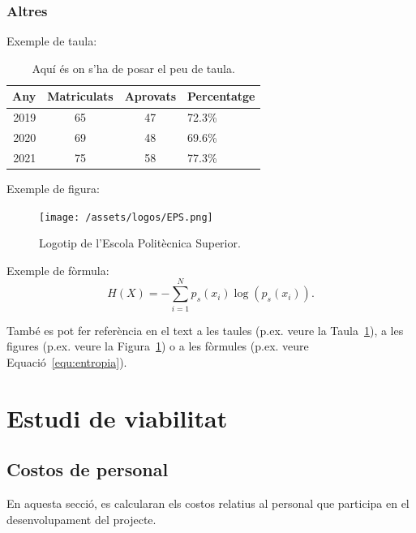 \documentclass[a4paper,12pt]{ThesisStyle}
\begin{document}
\subsection{Altres}

Exemple de taula:
\begin{table}[htb]
  \centering
  \begin{tabular}{ | r | c | c | l | }
    \hline
    Any  & Matriculats & Aprovats & Percentatge \\
    \hline
    2019 & 65          & 47       & 72.3\%      \\
    2020 & 69          & 48       & 69.6\%      \\
    2021 & 75          & 58       & 77.3\%      \\
    \hline
  \end{tabular}
  \caption{\label{taula:taulaexemple} Aquí és on s'ha de posar el peu de taula. }
\end{table}

Exemple de figura:
\begin{figure}[htb]
  \centering
  \texttt{[image: /assets/logos/EPS.png]}
  \caption{\label{fig:logo} Logotip de l'Escola Politècnica Superior.}
\end{figure}

Exemple de fòrmula:
\begin{equation}
  H(X) = -\sum_{i=1}^{N}p_s(x_i) \log \left( p_s(x_i) \right).
  \label{equ:entropia}
\end{equation}


També es pot fer referència en el text a les taules (p.ex. veure la Taula~\ref{taula:taulaexemple}), a les figures (p.ex. veure la Figura~\ref{fig:logo}) o a les fòrmules (p.ex. veure Equació~\ref{equ:entropia}).



\chapter{Estudi de viabilitat}
\label{cap:viabilitat}

\section{Costos de personal}
\label{sec:costos_personal}

En aquesta secció, es calcularan els costos relatius al personal que participa en el desenvolupament del projecte.
\end{document}
